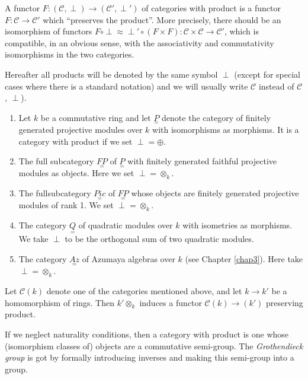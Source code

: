 A functor $F: (\mathscr{C}, \perp) \to (\mathscr{C}', \perp')$ of
categories with product is a functor $F: \mathscr{C} \to \mathscr{C}'$
which  ``preserves the product''. More precisely, there should be an
isomorphism of functors $F \circ \perp \approx \perp' \circ (F \times F):
\mathscr{C} \times \mathscr{C} \to \mathscr{C}'$, which is compatible,
in an obvious sense, with the associativity and commutativity
isomorphisms in the two categories. 

Hereafter all products will be denoted by the same symbol $\perp$
(except for special cases where there is a standard notation) and we
will usually write $\mathscr{C}$ instead of $\mathscr{C}$, $\perp$). 

\begin{examples*}
\begin{enumerate}[1)]
\item Let $k$ be a commutative ring and let $\underset{=}P$ denote the
  category of finitely generated projective modules over $k$ with
  isomorphisms as morphisms. It is a category with product if we set
  $\perp = \oplus$. 

\item The full subcategory $\underset{=}{FP}$ of $\underset{=}P$ with
  finitely generated faithful projective modules as objects. Here we
  set $\perp = \otimes_k$. 

\item The full\pageoriginale subcategory $\underset{=}{Pic}$ of
  $\underset{=}{FP}$ 
  whose objects are finitely generated projective modules of rank
  1. We set $\perp = \otimes_k$.  

\item The category $\underset{=}Q$ of quadratic modules over $k$ with
  isometries as morphisms. We take $\perp$ to be the orthogonal sum of
  two quadratic modules.  

\item The category $\underset{=}{Az}$ of Azumaya algebras over $k$
  (see Chapter \ref{chap3}). Here take $\perp = \otimes_k$. 
\end{enumerate}
\end{examples*}

Let $\mathscr{C}(k)$ denote one of the categories mentioned above, and
let $k \to k'$ be a homomorphism of rings. Then $k' \otimes_k$ induces
a functor $\mathscr{C}(k) \to (k')$ preserving product. 

If we neglect naturality conditions, then a category with product is
one whose (isomorphism classes of) objects are a commutative
semi-group. The \textit{Grothendieck group} is got by formally
introducing inverses and making this semi-group into a group. 

